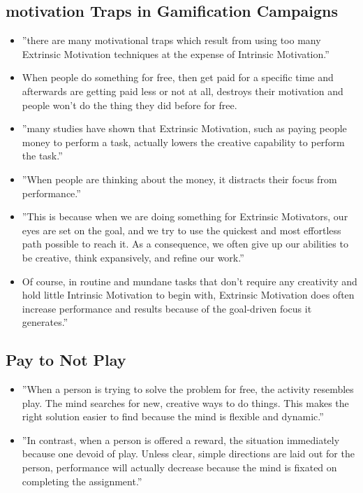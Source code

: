\subsection{motivation Traps in Gamification Campaigns}
\begin{itemize}
    \item ''there are many motivational traps which result from using too many Extrinsic Motivation techniques at the expense of Intrinsic Motivation.''
    \item When people do something for free, then get paid for a specific time and afterwards are getting paid less or not at all, destroys their motivation and people won't do the thing they did before for free.
    \item ''many studies have shown that Extrinsic Motivation, such as paying people money to perform a task, actually lowers the creative capability to perform the task.''
    \item ''When people are thinking about the money, it distracts their focus from performance.''
    \item ''This is because when we are doing something for Extrinsic Motivators, our eyes are set on the goal, and we try to use the quickest and most effortless path possible to reach it. As a consequence, we often give up our abilities to be creative, think expansively, and refine our work.''
    \item Of course, in routine and mundane tasks that don't require any creativity and hold little Intrinsic Motivation to begin with, Extrinsic Motivation does often increase performance and results because of the goal-driven focus it generates.''
\end{itemize}

\subsection{Pay to Not Play}
    \begin{itemize}
        \item ''When a person is trying to solve the problem for free, the activity resembles play. The mind searches for new, creative ways to do things. This makes the right solution easier to find because the mind is flexible and dynamic.''
        \item ''In contrast, when a person is offered a reward, the situation immediately because one devoid of play. Unless clear, simple directions are laid out for the person, performance will actually decrease because the mind is fixated on completing the assignment.''
    \end{itemize}
    
